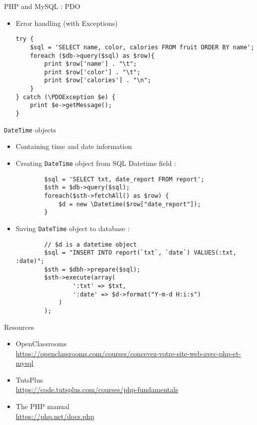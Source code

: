 \documentclass{beamer}
\begin{document}
\begin{frame}[fragile]{PHP and MySQL : PDO}
    \begin{itemize}
\item Error handling (with Exceptions)
            \begin{lstlisting}
try {
    $sql = 'SELECT name, color, calories FROM fruit ORDER BY name';
    foreach ($db->query($sql) as $row){
        print $row['name'] . "\t";
        print $row['color'] . "\t";
        print $row['calories'] . "\n";
	}
} catch (\PDOException $e) {
	print $e->getMessage();
}
            \end{lstlisting}
    \end{itemize}
\end{frame}

\begin{frame}[fragile]{\texttt{DateTime} objects}
    \begin{itemize}
	\item Containing time and date information
	\item Creating \texttt{DateTime} object from SQL Datetime field :
	\begin{lstlisting}
		$sql = 'SELECT txt, date_report FROM report';
		$sth = $db->query($sql);
		foreach($sth->fetchAll() as $row) {
			$d = new \Datetime($row["date_report"]);
		}
	\end{lstlisting}
	\item Saving \texttt{DateTime} object to database :
	\begin{lstlisting}
		// $d is a datetime object
		$sql = "INSERT INTO report(`txt`, `date`) VALUES(:txt, :date)";
		$sth = $dbh->prepare($sql);
		$sth->execute(array(
				':txt' => $txt,
				':date' => $d->format("Y-m-d H:i:s")
			)
		);
	\end{lstlisting}
\end{itemize}
\end{frame}

\begin{frame}[fragile]{Resources}
\begin{itemize}
	\item OpenClassrooms \\ \url{https://openclassrooms.com/courses/concevez-votre-site-web-avec-php-et-mysql}
	\item TutsPlus \\ \url{https://code.tutsplus.com/courses/php-fundamentals}
	\item The PHP manual \\ \url{https://php.net/docs.php}
\end{itemize}
\end{frame}
\end{document}
